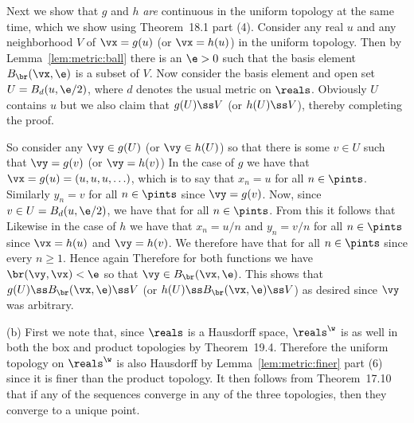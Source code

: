 {{    Next we show that $g$ and $h$ \emph{are} continuous in the uniform topology at the same time, which we show using Theorem~18.1 part (4).
    Consider any real $u$ and any neighborhood $V$ of $\vx = g(u)$ (or $\vx = h(u)$) in the uniform topology.
    Then by Lemma~\ref{lem:metric:ball} there is an $\e > 0$ such that the basis element $B_{\br}(\vx, \e)$ is a subset of $V$.
    Now consider the basis element and open set $U = B_d(u, \e/2)$, where $d$ denotes the usual metric on $\reals$.
    Obviously $U$ contains $u$ but we also claim that $g(U) \ss V$ (or $h(U) \ss V$), thereby completing the proof.

    So consider any $\vy \in g(U)$ (or $\vy \in h(U)$) so that there is some $v \in U$ such that $\vy = g(v)$ (or $\vy = h(v)$)
    In the case of $g$ we have that $\vx = g(u) = (u,u,u,\ldots)$, which is to say that $x_n = u$ for all $n \in \pints$.
    Similarly $y_n = v$ for all $n \in \pints$ since $\vy = g(v)$.
    Now, since $v \in U = B_d(u,\e/2)$, we have that
    for all $n \in \pints$.
    From this it follows that
    Likewise in the case of $h$ we have that $x_n = u/n$ and $y_n = v/n$ for all $n \in \pints$ since $\vx = h(u)$ and $\vy = h(v)$.
    We therefore have that
    for all $n \in \pints$ since every $n \geq 1$.
    Hence again
    Therefore for both functions we have $\br(\vy, \vx) < \e$ so that $\vy \in B_{\br}(\vx, \e)$.
    This shows that $g(U) \ss B_{\br}(\vx, \e) \ss V$ (or $h(U) \ss B_{\br}(\vx, \e) \ss V$) as desired since $\vy$ was arbitrary.
  }

  (b) First we note that, since $\reals$ is a Hausdorff space, $\reals^\w$ is as well in both the box and product topologies by Theorem~19.4.
  Therefore the uniform topology on $\reals^\w$ is also Hausdorff by Lemma~\ref{lem:metric:finer} part (6) since it is finer than the product topology.
  It then follows from Theorem~17.10 that if any of the sequences converge in any of the three topologies, then they converge to a unique point.

}
